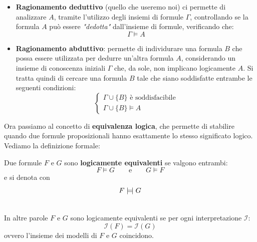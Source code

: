 \begin{itemize}
    \item \textbf{Ragionamento deduttivo} (quello che useremo noi) ci permette di analizzare $A$,
    tramite l'utilizzo degli insiemi di formule $\Gamma$, controllando se la formula $A$ può essere \textit{"dedotta"}
    dall'insieme di formule, verificando che:
    \[  \Gamma \models A   \]
    
    \item \textbf{Ragionamento abduttivo}: permette di individurare una formula $B$ che possa essere utilizzata per dedurre un'altra formula $A$,
    considerando un insieme di conoscenza iniziali $\Gamma$ che, da sole, non implicano logicamente $A$. Si tratta quindi di cercare una formula $B$ tale che siano soddisfatte entrambe 
    le seguenti condizioni:
    \[   \begin{cases}
        \Gamma \cup \{B\} \text{  è soddisfacibile} \\
         \Gamma \cup \{B\} \models A
    \end{cases}       \]

\end{itemize}
Ora passiamo al concetto di \textbf{equivalenza logica}, che permette di stabilire quando due formule proposizionali hanno esattamente lo stesso significato logico. 
Vediamo la definizione formale:\smallskip\\
\colorbox{SALZO}{\parbox{\dimexpr\linewidth-2\fboxsep}{\begin{definition}
    Due formule $F$ e $G$ sono \textbf{logicamente equivalenti} se valgono entrambi:
    \[     F \models G \qquad \text{e} \qquad G \models F  \]
    e si denota con
    \[  F \bimodels G  \]
\end{definition}}}\smallskip\\
In altre parole $F$ e $G$ sono logicamente equivalenti se per ogni interpretazione $\mathcal{I}$:
\[  \mathcal{I}(F) = \mathcal{I}(G)     \]
ovvero l'insieme dei modelli di $F$ e $G$ coincidono. 




